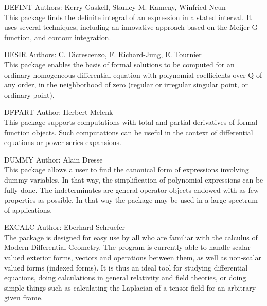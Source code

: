 \begin{Package}{DEFINT}
Authors: Kerry Gaskell, Stanley M. Kameny, Winfried Neun\\

This package finds the definite integral of an expression in a stated
interval.  It uses several techniques, including an innovative approach
based on the Meijer G-function, and contour integration.
\end{Package}

\begin{Package}{DESIR}
Authors: C. Dicrescenzo, F. Richard-Jung, E. Tournier\\

This package enables the basis of formal solutions to be computed for an
ordinary homogeneous differential equation with polynomial coefficients
over Q of any order, in the neighborhood of zero (regular or irregular
singular point, or ordinary point).
\end{Package}

\begin{Package}{DFPART}
Author: Herbert Melenk\\

This package supports computations with total and partial derivatives of
formal function objects.  Such computations can be useful in the context
of differential equations or power series expansions.
\end{Package}

\begin{Package}{DUMMY}
Author: Alain Dresse\\

This package allows a user to find the canonical form of expressions
involving dummy variables. In that way, the simplification of
polynomial expressions can be fully done. The indeterminates are general
operator objects endowed with as few properties as possible. In that way
the package may be used in a large spectrum of applications.
\end{Package}

\begin{Package}{EXCALC}
Author: Eberhard Schruefer\\

The  package is designed for easy use by all who are familiar
with the calculus of Modern Differential Geometry.  The program is currently
able to handle scalar-valued exterior forms, vectors and operations between
them, as well as non-scalar valued forms (indexed forms).  It is thus an ideal
tool for studying differential equations, doing calculations in general
relativity and field theories, or doing simple things such as calculating the
Laplacian of a tensor field for an arbitrary given frame. 
\end{Package}

